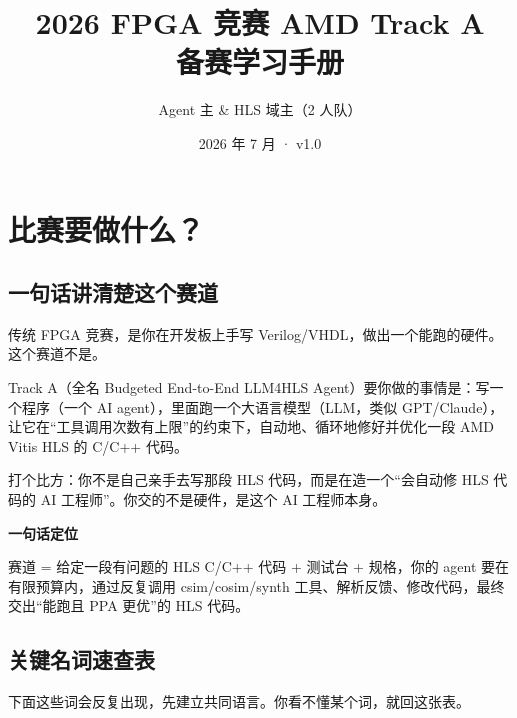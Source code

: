 \documentclass[12pt,a4paper]{ctexbook}
\title{\sffamily\LARGE 2026 FPGA 竞赛 AMD Track A\\备赛学习手册}
\author{Agent 主 \& HLS 域主（2 人队）}
\date{2026 年 7 月 · v1.0}
\begin{document}
\maketitle

\tableofcontents
\newpage

\chapter{比赛要做什么？}

\section{一句话讲清楚这个赛道}

传统 FPGA 竞赛，是你在开发板上手写 Verilog/VHDL，做出一个能跑的硬件。这个赛道不是。

Track A（全名 Budgeted End-to-End LLM4HLS Agent）要你做的事情是：写一个程序（一个 AI agent），里面跑一个大语言模型（LLM，类似 GPT/Claude），让它在“工具调用次数有上限”的约束下，自动地、循环地修好并优化一段 AMD Vitis HLS 的 C/C++ 代码。

打个比方：你不是自己亲手去写那段 HLS 代码，而是在造一个“会自动修 HLS 代码的 AI 工程师”。你交的不是硬件，是这个 AI 工程师本身。

\begin{tipbox}
\textbf{一句话定位}\par
赛道 = 给定一段有问题的 HLS C/C++ 代码 + 测试台 + 规格，你的 agent 要在有限预算内，通过反复调用 csim/cosim/synth 工具、解析反馈、修改代码，最终交出“能跑且 PPA 更优”的 HLS 代码。
\end{tipbox}

\section{关键名词速查表}

下面这些词会反复出现，先建立共同语言。你看不懂某个词，就回这张表。
\end{document}
